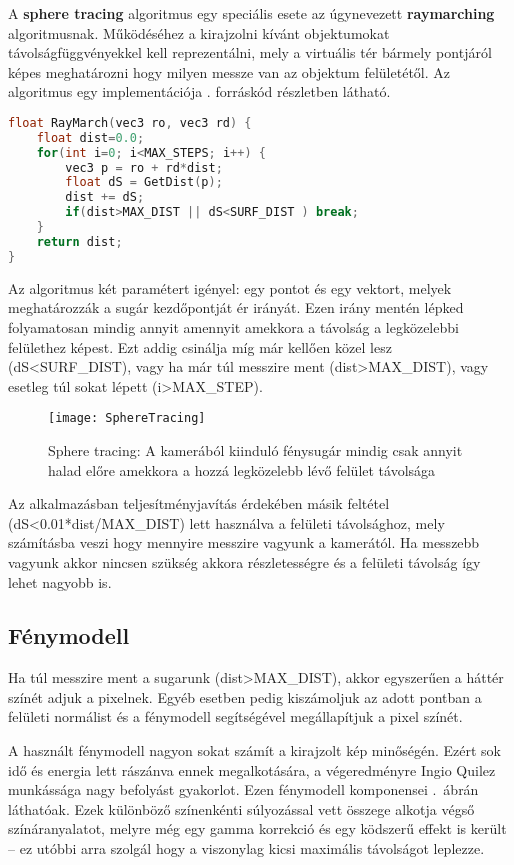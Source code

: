 A \textbf{sphere tracing} algoritmus egy speciális esete az úgynevezett \textbf{raymarching} algoritmusnak. Működéséhez a kirajzolni kívánt objektumokat távolságfüggvényekkel kell reprezentálni, mely a virtuális tér bármely pontjáról képes meghatározni hogy milyen messze van az objektum felületétől. Az algoritmus egy implementációja . forráskód részletben látható.

\begin{lstlisting}[language={C++}]
float RayMarch(vec3 ro, vec3 rd) {
	float dist=0.0;    
    for(int i=0; i<MAX_STEPS; i++) {
    	vec3 p = ro + rd*dist;
        float dS = GetDist(p);
        dist += dS;
        if(dist>MAX_DIST || dS<SURF_DIST ) break;
    }    
    return dist;
}
\end{lstlisting}

Az algoritmus két paramétert igényel: egy pontot és egy vektort, melyek meghatározzák a sugár kezdőpontját ér irányát. Ezen irány mentén lépked folyamatosan mindig annyit amennyit amekkora a távolság a legközelebbi felülethez képest. Ezt addig csinálja míg már kellően közel lesz (dS<SURF\_DIST), vagy ha már túl messzire ment (dist>MAX\_DIST), vagy esetleg túl sokat lépett (i>MAX\_STEP). 


\begin{figure}[H]
	\centering
	\texttt{[image: SphereTracing]}
	\caption{Sphere tracing: A kamerából kiinduló fénysugár mindig csak annyit halad előre amekkora a hozzá legközelebb lévő felület távolsága \cite{Raymarch94:online}}
	\label{fig:SphereTracing2}
\end{figure}

Az alkalmazásban teljesítményjavítás érdekében másik feltétel (dS<0.01*dist/MAX\_DIST) lett használva a felületi távolsághoz, mely számításba veszi hogy mennyire messzire vagyunk a kamerától. Ha messzebb vagyunk akkor nincsen szükség akkora részletességre és a felületi távolság így lehet nagyobb is.

\subsection{Fénymodell}
\label{sec:lighting}
Ha túl messzire ment a sugarunk (dist>MAX\_DIST), akkor egyszerűen a háttér színét adjuk a pixelnek. Egyéb esetben pedig kiszámoljuk az adott pontban a felületi normálist és a fénymodell segítségével megállapítjuk a pixel színét.

A használt fénymodell nagyon sokat számít a kirajzolt kép minőségén. Ezért sok idő és energia lett rászánva ennek megalkotására, a végeredményre Ingio Quilez munkássága \cite{iqShader82:online} nagy befolyást gyakorlot. Ezen fénymodell komponensei .~ábrán láthatóak. Ezek különböző színenkénti súlyozással vett összege alkotja végső színáranyalatot, melyre még egy gamma korrekció és egy ködszerű effekt is került -- ez utóbbi arra szolgál hogy a viszonylag kicsi maximális távolságot leplezze.

